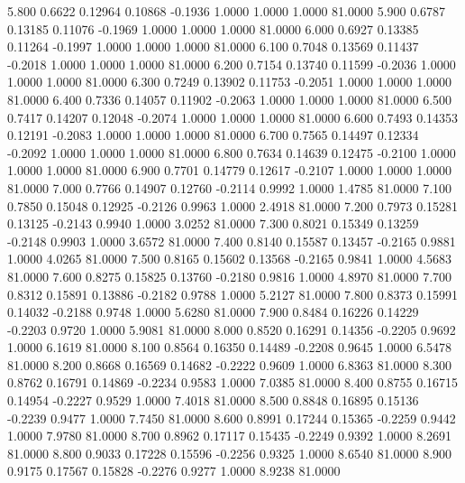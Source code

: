    5.800   0.6622   0.12964   0.10868  -0.1936   1.0000   1.0000   1.0000  81.0000
   5.900   0.6787   0.13185   0.11076  -0.1969   1.0000   1.0000   1.0000  81.0000
   6.000   0.6927   0.13385   0.11264  -0.1997   1.0000   1.0000   1.0000  81.0000
   6.100   0.7048   0.13569   0.11437  -0.2018   1.0000   1.0000   1.0000  81.0000
   6.200   0.7154   0.13740   0.11599  -0.2036   1.0000   1.0000   1.0000  81.0000
   6.300   0.7249   0.13902   0.11753  -0.2051   1.0000   1.0000   1.0000  81.0000
   6.400   0.7336   0.14057   0.11902  -0.2063   1.0000   1.0000   1.0000  81.0000
   6.500   0.7417   0.14207   0.12048  -0.2074   1.0000   1.0000   1.0000  81.0000
   6.600   0.7493   0.14353   0.12191  -0.2083   1.0000   1.0000   1.0000  81.0000
   6.700   0.7565   0.14497   0.12334  -0.2092   1.0000   1.0000   1.0000  81.0000
   6.800   0.7634   0.14639   0.12475  -0.2100   1.0000   1.0000   1.0000  81.0000
   6.900   0.7701   0.14779   0.12617  -0.2107   1.0000   1.0000   1.0000  81.0000
   7.000   0.7766   0.14907   0.12760  -0.2114   0.9992   1.0000   1.4785  81.0000
   7.100   0.7850   0.15048   0.12925  -0.2126   0.9963   1.0000   2.4918  81.0000
   7.200   0.7973   0.15281   0.13125  -0.2143   0.9940   1.0000   3.0252  81.0000
   7.300   0.8021   0.15349   0.13259  -0.2148   0.9903   1.0000   3.6572  81.0000
   7.400   0.8140   0.15587   0.13457  -0.2165   0.9881   1.0000   4.0265  81.0000
   7.500   0.8165   0.15602   0.13568  -0.2165   0.9841   1.0000   4.5683  81.0000
   7.600   0.8275   0.15825   0.13760  -0.2180   0.9816   1.0000   4.8970  81.0000
   7.700   0.8312   0.15891   0.13886  -0.2182   0.9788   1.0000   5.2127  81.0000
   7.800   0.8373   0.15991   0.14032  -0.2188   0.9748   1.0000   5.6280  81.0000
   7.900   0.8484   0.16226   0.14229  -0.2203   0.9720   1.0000   5.9081  81.0000
   8.000   0.8520   0.16291   0.14356  -0.2205   0.9692   1.0000   6.1619  81.0000
   8.100   0.8564   0.16350   0.14489  -0.2208   0.9645   1.0000   6.5478  81.0000
   8.200   0.8668   0.16569   0.14682  -0.2222   0.9609   1.0000   6.8363  81.0000
   8.300   0.8762   0.16791   0.14869  -0.2234   0.9583   1.0000   7.0385  81.0000
   8.400   0.8755   0.16715   0.14954  -0.2227   0.9529   1.0000   7.4018  81.0000
   8.500   0.8848   0.16895   0.15136  -0.2239   0.9477   1.0000   7.7450  81.0000
   8.600   0.8991   0.17244   0.15365  -0.2259   0.9442   1.0000   7.9780  81.0000
   8.700   0.8962   0.17117   0.15435  -0.2249   0.9392   1.0000   8.2691  81.0000
   8.800   0.9033   0.17228   0.15596  -0.2256   0.9325   1.0000   8.6540  81.0000
   8.900   0.9175   0.17567   0.15828  -0.2276   0.9277   1.0000   8.9238  81.0000
